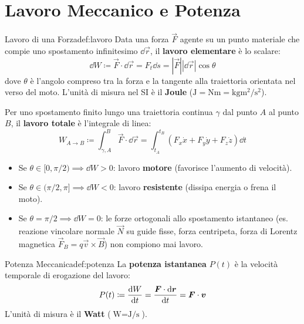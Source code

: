 \section{Lavoro Meccanico e Potenza}
\label{sec:lavoro_potenza}

\begin{definizione}{Lavoro di una Forza}{def:lavoro}
Data una forza $\vec{F}$ agente su un punto materiale che compie uno spostamento infinitesimo $\dd\vec{r}$, il \textbf{lavoro elementare} è lo scalare:
\begin{equation}
    \dd W \coloneqq \vec{F}\cdot\dd\vec{r} = F_t \dd s = |\vec{F}| |\dd\vec{r}| \cos\theta
    \label{eq:lavoro_elementare}
\end{equation}
dove $\theta$ è l'angolo compreso tra la forza e la tangente alla traiettoria orientata nel verso del moto.
L'unità di misura nel SI è il \textbf{Joule} ($\si{\joule} = \si{\newton\metre} = \si{\kilogram\metre\squared\per\second\squared}$).

Per uno spostamento finito lungo una traiettoria continua $\gamma$ dal punto $A$ al punto $B$, il \textbf{lavoro totale} è l'integrale di linea:
\begin{equation}
    W_{A\to B} \coloneqq \int_{\gamma, A}^B \vec{F}\cdot\dd\vec{r} = \int_{t_A}^{t_B} \left(F_x \dot{x} + F_y \dot{y} + F_z \dot{z}\right)\dd t
    \label{eq:lavoro_integrale}
\end{equation}
\end{definizione}

\begin{itemize}
    \item Se $\theta \in [0, \pi/2) \implies \dd W > 0$: lavoro \textbf{motore} (favorisce l'aumento di velocità).
    \item Se $\theta \in (\pi/2, \pi] \implies \dd W < 0$: lavoro \textbf{resistente} (dissipa energia o frena il moto).
    \item Se $\theta = \pi/2 \implies \dd W = 0$: le forze ortogonali allo spostamento istantaneo (es. reazione vincolare normale $\vec{N}$ su guide fisse, forza centripeta, forza di Lorentz magnetica $\vec{F}_B = q\vec{v}\times\vec{B}$) non compiono mai lavoro.
\end{itemize}

\begin{definizione}{Potenza Meccanica}{def:potenza}
La \textbf{potenza istantanea} $P(t)$ è la velocità temporale di erogazione del lavoro:
\begin{equation}
    P(t) \coloneqq \frac{\mathrm{d} W}{\mathrm{d} t} = \frac{\bm{F}\cdot\mathrm{d}\bm{r}}{\mathrm{d} t} = \bm{F}\cdot\bm{v}
    \label{eq:potenza}
\end{equation}
L'unità di misura è il \textbf{Watt} ($\si{\watt} = \si{\joule\per\second}$).
\end{definizione}

